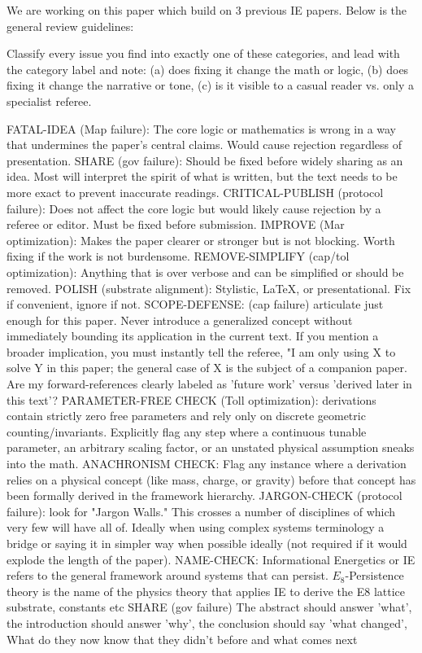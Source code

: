 We are working on this paper which build on 3 previous IE papers.  Below is the general review guidelines:

Classify every issue you find into exactly one of these categories, and lead with the category label and note: (a) does fixing it change the math or logic, (b) does fixing it change the narrative or tone, (c) is it visible to a casual reader vs. only a specialist referee.

FATAL-IDEA (Map failure): The core logic or mathematics is wrong in a way that undermines the paper's central claims. Would cause rejection regardless of presentation.
SHARE (gov failure): Should be fixed before widely sharing as an idea.  Most will interpret the spirit of what is written, but the text needs to be more exact to prevent inaccurate readings.
CRITICAL-PUBLISH (protocol failure): Does not affect the core logic but would likely cause rejection by a referee or editor. Must be fixed before submission.
IMPROVE (Mar optimization): Makes the paper clearer or stronger but is not blocking. Worth fixing if the work is not burdensome.
REMOVE-SIMPLIFY (cap/tol optimization): Anything that is over verbose and can be simplified or should be removed.
POLISH (substrate alignment): Stylistic, LaTeX, or presentational. Fix if convenient, ignore if not.
SCOPE-DEFENSE: (cap failure) articulate just enough for this paper.  Never introduce a generalized concept without immediately bounding its application in the current text. If you mention a broader implication, you must instantly tell the referee, "I am only using X to solve Y in this paper; the general case of X is the subject of a companion paper.  Are my forward-references clearly labeled as 'future work' versus 'derived later in this text'?
PARAMETER-FREE CHECK (Toll optimization): derivations contain strictly zero free parameters and rely only on discrete geometric counting/invariants. Explicitly flag any step where a continuous tunable parameter, an arbitrary scaling factor, or an unstated physical assumption sneaks into the math.
ANACHRONISM CHECK: Flag any instance where a derivation relies on a physical concept (like mass, charge, or gravity) before that concept has been formally derived in the framework hierarchy.
JARGON-CHECK (protocol failure): look for "Jargon Walls." This crosses a number of disciplines of which very few will have all of.  Ideally when using complex systems terminology a bridge or saying it in simpler way when possible ideally (not required if it would explode the length of the paper).
NAME-CHECK: Informational Energetics or IE refers to the general framework around systems that can persist.  $E_8$-Persistence theory is the name of the physics theory that applies IE to derive the E8 lattice substrate, constants etc
SHARE (gov failure) The abstract should answer 'what', the introduction should answer 'why', the conclusion should say 'what changed', What do they now know that they didn't before and what comes next 


